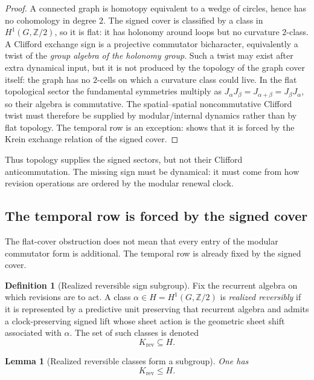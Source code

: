 \documentclass[11pt]{article}
\newtheorem{lemma}[theorem]{Lemma}
\theoremstyle{definition}
\newtheorem{definition}[theorem]{Definition}
\theoremstyle{remark}
\newcommand{\Z}{\mathbb{Z}}
\newcommand{\Ztwo}{\mathbb{Z}/2}
\begin{document}
\begin{proof}
A connected graph is homotopy equivalent to a wedge of circles, hence has no
cohomology in degree \(2\).  The signed cover is classified by a class in
\(H^1(G,\Z/2)\), so it is flat: it has holonomy around loops but no curvature
\(2\)-class.  A Clifford exchange sign is a projective commutator bicharacter, equivalently a
twist of the \emph{group algebra of the holonomy group}.  Such a twist may exist
after extra dynamical input, but it is not produced by the topology of the graph
cover itself: the graph has no \(2\)-cells on which a curvature class could live.
In the flat topological sector the fundamental symmetries multiply as
\(J_\alpha J_\beta=J_{\alpha+\beta}=J_\beta J_\alpha\), so their algebra is
commutative.  The spatial--spatial noncommutative Clifford twist must therefore be supplied by
modular/internal dynamics rather than by flat topology.  The temporal row is an
exception:  shows that it is forced by the
Krein exchange relation of the signed cover.
\end{proof}

Thus topology supplies the signed sectors, but not their Clifford
anticommutation.  The missing sign must be dynamical: it must come from how
revision operations are ordered by the modular renewal clock.


\subsection{The temporal row is forced by the signed cover}
\label{subsec:temporal-row-forced}

The flat-cover obstruction does not mean that every entry of the modular
commutator form is additional.  The temporal row is already fixed by the signed
cover.

\begin{definition}[Realized reversible sign subgroup]
\label{def:realized-reversible-subgroup}
Fix the recurrent algebra on which revisions are to act.  A class
\(\alpha\in H=H^1(G,\Ztwo)\) is \emph{realized reversibly} if it is represented
by a predictive unit preserving that recurrent algebra and admits a
clock-preserving signed lift whose sheet action is the geometric sheet shift
associated with \(\alpha\).  The set of such classes is denoted
\[
  K_{\mathrm{rev}}\subseteq H .
\]
\end{definition}

\begin{lemma}[Realized reversible classes form a subgroup]
\label{lem:realized-reversible-subgroup}
One has
\[
  K_{\mathrm{rev}}\le H .
\]
\end{lemma}
\end{document}
